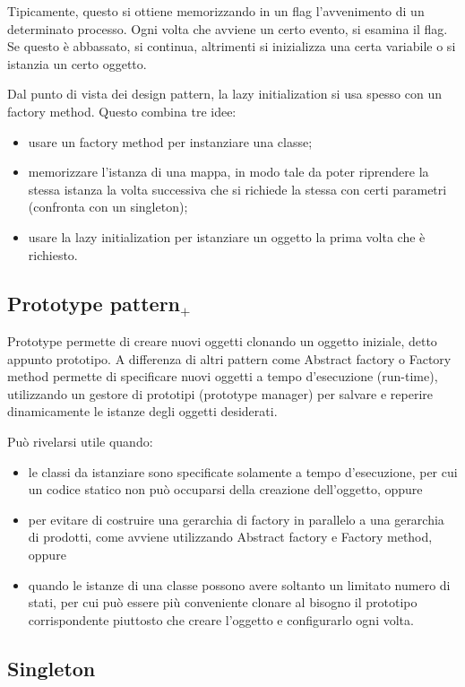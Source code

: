 Tipicamente, questo si ottiene memorizzando in un flag l'avvenimento di un determinato processo. Ogni volta che avviene un certo evento, si esamina il flag. Se questo è abbassato, si continua, altrimenti si inizializza una certa variabile o si istanzia un certo oggetto.

Dal punto di vista dei design pattern, la lazy initialization si usa spesso con un factory method. Questo combina tre idee:
\begin{itemize}
	\item usare un factory method per instanziare una classe;
	\item memorizzare l'istanza di una mappa, in modo tale da poter riprendere la stessa istanza la volta successiva che si richiede la stessa con certi parametri (confronta con un singleton);
	\item usare la lazy initialization per istanziare un oggetto la prima volta che è richiesto.
\end{itemize}

\subsection{Prototype pattern$_+$}
Prototype permette di creare nuovi oggetti clonando un oggetto iniziale, detto appunto prototipo. A differenza di altri pattern come Abstract factory o Factory method permette di specificare nuovi oggetti a tempo d'esecuzione (run-time), utilizzando un gestore di prototipi (prototype manager) per salvare e reperire dinamicamente le istanze degli oggetti desiderati.

Può rivelarsi utile quando:
\begin{itemize}
\item le classi da istanziare sono specificate solamente a tempo d'esecuzione, per cui un codice statico non può occuparsi della creazione dell'oggetto, oppure
\item per evitare di costruire una gerarchia di factory in parallelo a una gerarchia di prodotti, come avviene utilizzando Abstract factory e Factory method, oppure
\item quando le istanze di una classe possono avere soltanto un limitato numero di stati, per cui può essere più conveniente clonare al bisogno il prototipo corrispondente piuttosto che creare l'oggetto e configurarlo ogni volta.
\end{itemize}
\subsection{Singleton}

